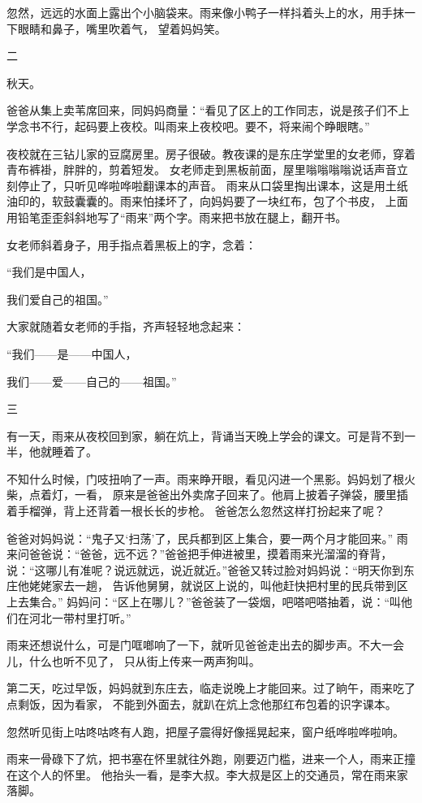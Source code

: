 \documentclass[12pt,UTF8]{ctexbook}
\begin{document}
忽然，远远的水面上露出个小脑袋来。雨来像小鸭子一样抖着头上的水，用手抹一下眼睛和鼻子，嘴里吹着气，
望着妈妈笑。

二

秋天。

爸爸从集上卖苇席回来，同妈妈商量：“看见了区上的工作同志，说是孩子们不上学念书不行，起码要上夜校。叫雨来上夜校吧。要不，将来闹个睁眼瞎。”

夜校就在三钻儿家的豆腐房里。房子很破。教夜课的是东庄学堂里的女老师，穿着青布裤褂，胖胖的，剪着短发。
女老师走到黑板前面，屋里嗡嗡嗡嗡说话声音立刻停止了，只听见哗啦哗啦翻课本的声音。
雨来从口袋里掏出课本，这是用土纸油印的，软鼓囊囊的。雨来怕揉坏了，向妈妈要了一块红布，包了个书皮，
上面用铅笔歪歪斜斜地写了“雨来”两个字。雨来把书放在腿上，翻开书。

女老师斜着身子，用手指点着黑板上的字，念着：

“我们是中国人，

我们爱自己的祖国。”

大家就随着女老师的手指，齐声轻轻地念起来：

“我们——是——中国人，

我们——爱——自己的——祖国。”

三

有一天，雨来从夜校回到家，躺在炕上，背诵当天晚上学会的课文。可是背不到一半，他就睡着了。

不知什么时候，门吱扭响了一声。雨来睁开眼，看见闪进一个黑影。妈妈划了根火柴，点着灯，一看，
原来是爸爸出外卖席子回来了。他肩上披着子弹袋，腰里插着手榴弹，背上还背着一根长长的步枪。
爸爸怎么忽然这样打扮起来了呢？

爸爸对妈妈说：“鬼子又‘扫荡’了，民兵都到区上集合，要一两个月才能回来。”
雨来问爸爸说：“爸爸，远不远？”爸爸把手伸进被里，摸着雨来光溜溜的脊背，
说：“这哪儿有准呢？说远就远，说近就近。”爸爸又转过脸对妈妈说：“明天你到东庄他姥姥家去一趟，
告诉他舅舅，就说区上说的，叫他赶快把村里的民兵带到区上去集合。”
妈妈问：“区上在哪儿？”爸爸装了一袋烟，吧嗒吧嗒抽着，说：“叫他们在河北一带村里打听。”

雨来还想说什么，可是门哐啷响了一下，就听见爸爸走出去的脚步声。不大一会儿，什么也听不见了，
只从街上传来一两声狗叫。

第二天，吃过早饭，妈妈就到东庄去，临走说晚上才能回来。过了晌午，雨来吃了点剩饭，因为看家，
不能到外面去，就趴在炕上念他那红布包着的识字课本。

忽然听见街上咕咚咕咚有人跑，把屋子震得好像摇晃起来，窗户纸哗啦哗啦响。

雨来一骨碌下了炕，把书塞在怀里就往外跑，刚要迈门槛，进来一个人，雨来正撞在这个人的怀里。
他抬头一看，是李大叔。李大叔是区上的交通员，常在雨来家落脚。
\end{document}
